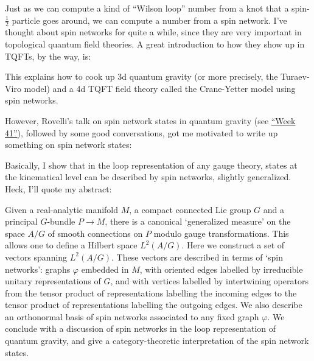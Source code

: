 \documentclass{article}
\def\tightlist{}
\renewcommand{\texttt}[1]{%
  \begingroup
  \ttfamily
  \begingroup\lccode`~=`/\lowercase{\endgroup\def~}{/\discretionary{}{}{}}%
  \begingroup\lccode`~=`[\lowercase{\endgroup\def~}{[\discretionary{}{}{}}%
  \begingroup\lccode`~=`.\lowercase{\endgroup\def~}{.\discretionary{}{}{}}%
  \catcode`/=\active\catcode`[=\active\catcode`.=\active
  \scantokens{#1\noexpand}%
  \endgroup
}
\begin{document}
Just as we can compute a kind of ``Wilson loop'' number from a knot that
a spin-\(\frac12\) particle goes around, we can compute a number from a
spin network. I've thought about spin networks for quite a while, since
they are very important in topological quantum field theories. A great
introduction to how they show up in TQFTs, by the way, is:


This explains how to cook up 3d quantum gravity (or more precisely, the
Turaev-Viro model) and a 4d TQFT field theory called the Crane-Yetter
model using spin networks.

However, Rovelli's talk on spin network states in quantum gravity (see
\protect\hyperlink{week41}{``Week 41''}), followed by some good
conversations, got me motivated to write up something on spin network
states:


Basically, I show that in the loop representation of any gauge theory,
states at the kinematical level can be described by spin networks,
slightly generalized. Heck, I'll quote my abstract:

Given a real-analytic manifold \(M\), a compact connected Lie group
\(G\) and a principal \(G\)-bundle \(P \to M\), there is a canonical
`generalized measure' on the space \(A/G\) of smooth connections on
\(P\) modulo gauge transformations. This allows one to define a Hilbert
space \(L^2(A/G)\). Here we construct a set of vectors spanning
\(L^2(A/G)\). These vectors are described in terms of `spin networks':
graphs \(\varphi\) embedded in \(M\), with oriented edges labelled by
irreducible unitary representations of \(G\), and with vertices labelled
by intertwining operators from the tensor product of representations
labelling the incoming edges to the tensor product of representations
labelling the outgoing edges. We also describe an orthonormal basis of
spin networks associated to any fixed graph \(\varphi\). We conclude
with a discussion of spin networks in the loop representation of quantum
gravity, and give a category-theoretic interpretation of the spin
network states.
\end{document}
